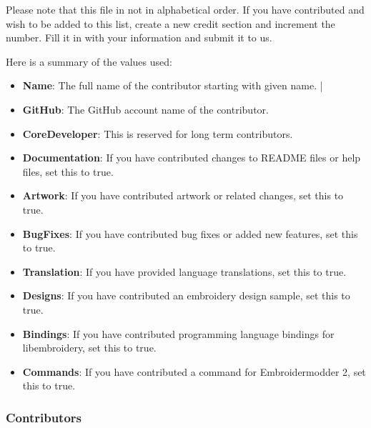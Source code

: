 \documentclass[10pt]{report}
\begin{document}
Please note that this file in not in alphabetical order. If you have contributed and wish to be added to this list, create a new credit section and increment the number. Fill it in with your information and submit it to us.

Here is a summary of the values used:

\begin{itemize}
\item \textbf{Name}: The full name of the contributor starting with given name.                                        |
\item \textbf{GitHub}: The GitHub account name of the contributor.
\item \textbf{CoreDeveloper}: This is reserved for long term contributors.
\item \textbf{Documentation}: If you have contributed changes to README files or
    help files, set this to true.
\item \textbf{Artwork}: If you have contributed artwork or related changes, set
    this to true.
\item \textbf{BugFixes}: If you have contributed bug fixes or added new
    features, set this to true.
\item \textbf{Translation}: If you have provided language translations, set this to true.
\item \textbf{Designs}: If you have contributed an embroidery design sample, set this to true.
\item \textbf{Bindings}: If you have contributed programming language
    bindings for libembroidery, set this to true.
\item \textbf{Commands}: If you have contributed a command for Embroidermodder 2, set this to true.
\end{itemize}

\subsubsection{Contributors}
\end{document}
